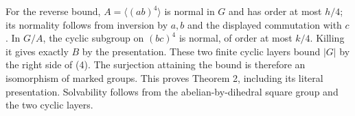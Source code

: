 For the reverse bound, \(A=\langle(ab)^4\rangle\) is normal in \(G\) and
has order at most \(h/4\); its normality follows from inversion by \(a,b\)
and the displayed commutation with \(c\). In \(G/A\), the cyclic subgroup
on \((bc)^4\) is normal, of order at most \(k/4\). Killing it gives exactly
\(B\) by the presentation. These two finite cyclic layers bound \(|G|\) by
the right side of (4). The surjection attaining the bound is therefore
an isomorphism of marked groups. This proves Theorem 2, including its
literal presentation. Solvability follows from the abelian-by-dihedral
square group and the two cyclic layers.
